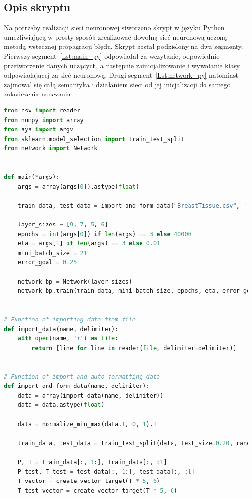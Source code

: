 \documentclass[12pt,twoside]{article}
\begin{document}
\subsection{Opis skryptu}
Na potrzeby realizacji sieci neuronowej stworzono skrypt w języku Python umożliwiającą w prosty sposób zrealizować dowolną sieć neuronową uczoną metodą wstecznej propagracji błędu. Skrypt został podzielony na dwa segmenty. Pierwszy segment~\ref{Lst:main_py} odpowiadał za wczytanie, odpowiednie przetworzenie danych uczących, a następnie zainicjalizowanie i wywołanie klasy odpowiadającej za sieć neuronową. Drugi segment~\ref{Lst:network_py} natomiast zajmował się całą semantyka i działaniem sieci od jej inicjalizacji do samego zakończenia nauczania.
\newline
\begin{lstlisting}[caption={Plik główny skryptu - main.py},label={Lst:main_py},language=Python,basicstyle=\scriptsize]
from csv import reader
from numpy import array
from sys import argv
from sklearn.model_selection import train_test_split
from network import Network


def main(*args):
    args = array(args[0]).astype(float)

    train_data, test_data = import_and_form_data("BreastTissue.csv", ';')

    layer_sizes = [9, 7, 5, 6]
    epochs = int(args[0]) if len(args) == 3 else 40000
    eta = args[1] if len(args) == 3 else 0.01
    mini_batch_size = 21
    error_goal = 0.25

    network_bp = Network(layer_sizes)
    network_bp.train(train_data, mini_batch_size, epochs, eta, error_goal, test_data=test_data)


# Function of importing data from file
def import_data(name, delimiter):
    with open(name, 'r') as file:
        return [line for line in reader(file, delimiter=delimiter)]


# Function of import and auto formatting data
def import_and_form_data(name, delimiter):
    data = array(import_data(name, delimiter))
    data = data.astype(float)

    data = normalize_min_max(data.T, 0, 1).T

    train_data, test_data = train_test_split(data, test_size=0.20, random_state=25)

    P, T = train_data[:, 1:], train_data[:, :1]
    P_test, T_test = test_data[:, 1:], test_data[:, :1]
    T_vector = create_vector_target(T * 5, 6)
    T_test_vector = create_vector_target(T * 5, 6)


\end{lstlisting}
\end{document}
